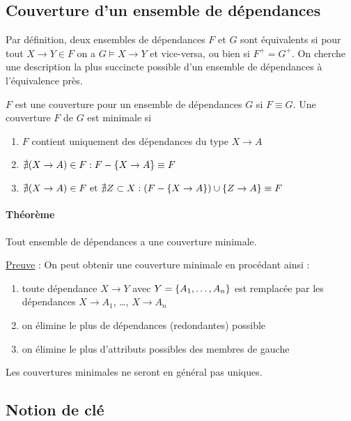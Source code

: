 			
		\subsection{Couverture d'un ensemble de dépendances}
		
		Par définition, deux ensembles de dépendances $F$ et $G$ sont équivalents si pour tout $X \rightarrow Y \in F$ on a $G \models X \rightarrow Y$ et vice-versa, ou bien si $F^+ = G^+$. On cherche une description la plus succincte possible d'un ensemble de dépendances à l'équivalence près.
		
		$F$ est une couverture pour un ensemble de dépendances $G$ si $F \equiv G$. Une couverture $F$ de $G$ est minimale si
		
		\begin{enumerate}
			\item $F$ contient uniquement des dépendances du type $X \rightarrow A$
			\item $\nexists (X \rightarrow A) \in F : F - \lbrace X \rightarrow A \rbrace \equiv F$
			\item $\nexists (X \rightarrow A) \in F \text{ et } \nexists Z \subset X : ( F - \lbrace X \rightarrow A \rbrace ) \cup \lbrace Z \rightarrow A \rbrace \equiv F$
		\end{enumerate}
		
		
		\paragraph{Théorème} Tout ensemble de dépendances a une couverture minimale.
		
		\underline{Preuve} : On peut obtenir une couverture minimale en procédant ainsi :
		
		\begin{enumerate}
			\item toute dépendance $X \rightarrow Y$ avec $Y = \lbrace A_1 , \dots , A_n \rbrace$ est remplacée par les dépendances $X \rightarrow A_1$, \dots , $X \rightarrow A_n$
			\item on élimine le plus de dépendances (redondantes) possible
			\item on élimine le plus d'attributs possibles des membres de gauche
		\end{enumerate}
		
		Les couvertures minimales ne seront en général pas uniques.
		
		
		\subsection{Notion de clé}
		

